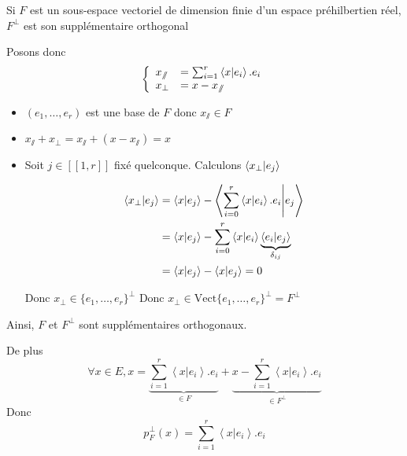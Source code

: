 \documentclass{article}
\renewenvironment{question_kholle}[2][ ]
{
	\subsection{\texorpdfstring{#2}{}}
	\notblank{#1}
	{
		\noindent #1
		\bigbreak
	}
	{}
	\begin{proof}
}
{
	\end{proof}
}
\begin{document}
\begin{question_kholle}{Si $F$ est un sous-espace vectoriel de dimension finie d'un espace préhilbertien réel, $F^{\perp}$ est son supplémentaire orthogonal}
\begin{itemize}[label=$\lozenge$]
		      Posons donc
		      $$\left\{ \begin{array}{ll}
				      x_{\sslash} & = \sum_{i=1}^{r} \braket{ x | e_{i} } .e_{i} \\
				      x_{\perp}   & = x - x_{\sslash}
			      \end{array}\right. $$
		      \begin{itemize}[label=$\star$]
			      \item $(e_{1}, \dots, e_{r})$ est une base de $F$ donc $x_{\sslash} \in F$
			      \item $x_{\sslash}+x_{\perp} = x_{\sslash}+ (x - x_{\sslash}) = x$
			      \item Soit $j \in [ \! [ 1, r ] \!]$ fixé quelconque. Calculons $\braket{ x_{\perp} | e_{j} }$

			            \begin{align*}
				            \braket{ x_{\perp} | e_{j} } & = \braket{ x | e_{j} }  - \left\langle  \sum_{i=0}^{r}\braket{ x | e_{i} } .e_{i} \Bigg|  e_{j} \right\rangle                                                         \\
				                                         & = \left\langle x | e_{j} \right\rangle - \sum_{i=0}^{r} \left\langle x | e_{i} \right\rangle\underbrace{  \left\langle e_{i} | e_{j} \right\rangle  }_{ \delta_{ij} } \\
				                                         & = \left\langle x | e_{j} \right\rangle  - \left\langle x | e_{j} \right\rangle  = 0
			            \end{align*}


			            Donc $x_{\perp} \in \{e_{1}, \dots, e_{r}\}^{\perp}$
			            Donc $x_{\perp} \in \text{Vect}\{ e_{1}, \dots, e_{r} \}^{\perp} = F^{\perp}$

		      \end{itemize}
	\end{itemize}
	Ainsi, $F$ et $F^{\perp}$ sont supplémentaires orthogonaux.

	De plus
	$$	\forall x \in E, x = \underbrace{ \sum_{i=1}^{r}\left\langle x | e_{i} \right\rangle .e_{i} }_{ \in F } + \underbrace{x - \sum_{i=1}^{r}\left\langle x | e_{i} \right\rangle .e_{i}  }_{ \in F^{\perp} }$$
	Donc $$p_{F}^{\perp}(x) = \sum_{i=1}^{r}\left\langle x | e_{i} \right\rangle .e_{i} $$

\end{question_kholle}
\end{document}
